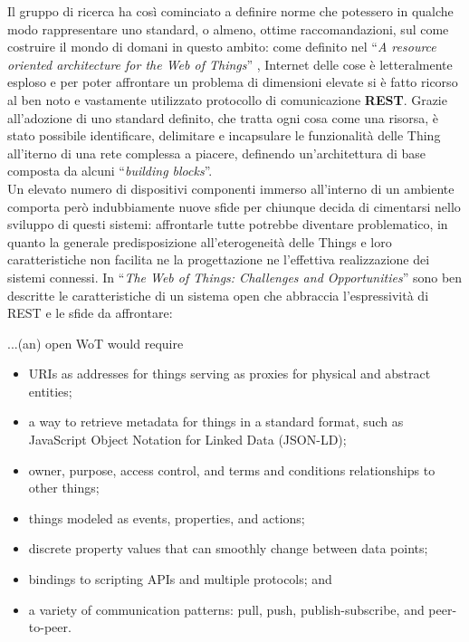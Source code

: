 \documentclass[12pt,a4paper,openright,oneside]{report}
\newcommand{\quotes}[1]{``#1''}
\begin{document}
Il gruppo di ricerca ha così cominciato a definire norme che potessero in qualche modo rappresentare uno standard, o almeno, ottime raccomandazioni, sul come costruire il mondo di domani in questo ambito: come definito nel \quotes{\textit{A resource oriented architecture for the Web of Things}} \cite{resource-oriented-wot}, Internet delle cose è letteralmente esploso e per poter affrontare un problema di dimensioni elevate si è fatto ricorso al ben noto e vastamente utilizzato protocollo di comunicazione \textbf{REST}. Grazie all'adozione di uno standard definito, che tratta ogni cosa come una risorsa, è stato possibile identificare, delimitare e incapsulare le funzionalità delle Thing all'iterno di una rete complessa a piacere, definendo un'architettura di base composta da alcuni \quotes{\textit{building blocks}}.\\

Un elevato numero di dispositivi componenti immerso all'interno di un ambiente comporta però indubbiamente nuove sfide per chiunque decida di cimentarsi nello sviluppo di questi sistemi: affrontarle tutte potrebbe diventare problematico, in quanto la generale predisposizione all'eterogeneità delle Things e loro caratteristiche non facilita ne la progettazione ne l'effettiva realizzazione dei sistemi connessi. In  \quotes{\textit{The Web of Things: Challenges and Opportunities}} \cite{wot-challenges} sono ben descritte le caratteristiche di un sistema open che abbraccia l'espressività di REST e le sfide da affrontare:

{\itshape
\begin{myquote}
	...(an) open WoT would require
	
	\begin{itemize}
		\setlength\itemsep{-0.2em}
		\item URIs as addresses for things serving as proxies for physical and abstract entities;
		\item a way to retrieve metadata for things in a standard format, such as JavaScript Object Notation for Linked Data (JSON-LD);
		\item owner, purpose, access control, and terms and conditions relationships to other things;
		\item things modeled as events, properties, and actions;
		\item discrete property values that can smoothly change between data points;
		\item bindings to scripting APIs and multiple protocols; and
		\item a variety of communication patterns: pull, push, publish-subscribe, and peer-to-peer.
	\end{itemize}
\end{myquote}
}
\end{document}
